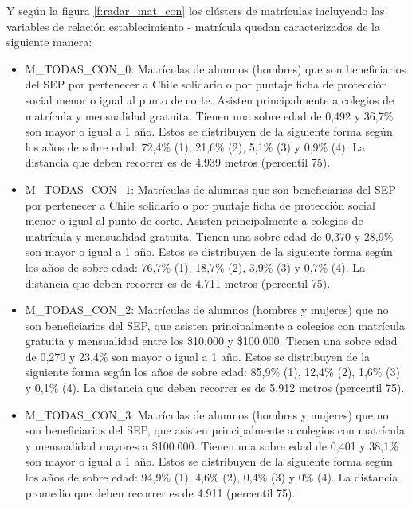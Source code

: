 Y según la figura \ref{f:radar_mat_con} los clústers de matrículas incluyendo las variables de relación establecimiento - matrícula quedan caracterizados de la siguiente manera:

\begin{itemize}
  \item M\_TODAS\_CON\_0: Matrículas de alumnos (hombres) que son beneficiarios del SEP por pertenecer a Chile solidario o por puntaje ficha de protección social menor o igual al punto de corte. Asisten principalmente a colegios de matrícula y mensualidad gratuita. Tienen una sobre edad de 0,492 y 36,7\% son mayor o igual a 1 año. Estos se distribuyen de la siguiente forma según los años de sobre edad: 72,4\% (1), 21,6\% (2), 5,1\% (3) y 0,9\% (4). La distancia que deben recorrer es de 4.939 metros (percentil 75).  
  \item M\_TODAS\_CON\_1: Matrículas de alumnas que son beneficiarias del SEP por pertenecer a Chile solidario o por puntaje ficha de protección social menor o igual al punto de corte. Asisten principalmente a colegios de matrícula y mensualidad gratuita. Tienen una sobre edad de 0,370 y 28,9\% son mayor o igual a 1 año. Estos se distribuyen de la siguiente forma según los años de sobre edad: 76,7\% (1), 18,7\% (2), 3,9\% (3) y 0,7\% (4). La distancia que deben recorrer es de 4.711 metros (percentil 75).
  \item M\_TODAS\_CON\_2: Matrículas de alumnos (hombres y mujeres) que no son beneficiarios del SEP, que asisten principalmente a colegios con matrícula gratuita y mensualidad entre los \$10.000 y \$100.000. Tienen una sobre edad de 0,270 y 23,4\% son mayor o igual a 1 año. Estos se distribuyen de la siguiente forma según los años de sobre edad: 85,9\% (1), 12,4\% (2), 1,6\% (3) y 0,1\% (4). La distancia que deben recorrer es de 5.912 metros (percentil 75).
  \item M\_TODAS\_CON\_3: Matrículas de alumnos (hombres y mujeres) que no son beneficiarios del SEP, que asisten principalmente a colegios con matrícula y mensualidad mayores a \$100.000.  Tienen una sobre edad de 0,401 y 38,1\% son mayor o igual a 1 año. Estos se distribuyen de la siguiente forma según los años de sobre edad: 94,9\% (1), 4,6\% (2), 0,4\% (3) y 0\% (4). La distancia promedio que deben recorrer es de 4.911 (percentil 75).
\end{itemize}

